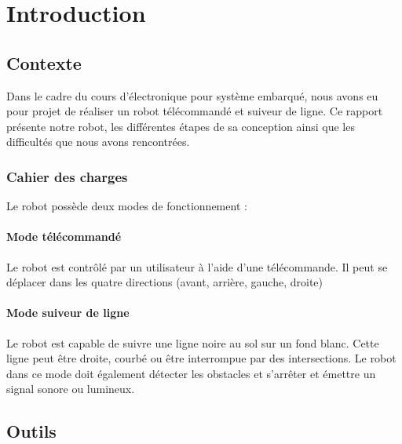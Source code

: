 \chapter{Introduction}

\section{Contexte}

Dans le cadre du cours d'électronique pour système embarqué,
nous avons eu pour projet de réaliser un robot télécommandé et suiveur de ligne.
Ce rapport présente notre robot, les différentes étapes de sa conception ainsi que les difficultés que nous avons rencontrées.


\subsection{Cahier des charges}

Le robot possède deux modes de fonctionnement :

\subsubsection{Mode télécommandé}

Le robot est contrôlé par un utilisateur à l'aide d'une télécommande.
Il peut se déplacer dans les quatre directions (avant, arrière, gauche, droite)

\subsubsection{Mode suiveur de ligne}

Le robot est capable de suivre une ligne noire au sol sur un fond blanc.
Cette ligne peut être droite, courbé ou être interrompue par des intersections.
Le robot dans ce mode doit également détecter les obstacles et s'arrêter et émettre un signal sonore ou lumineux.

\section{Outils}

